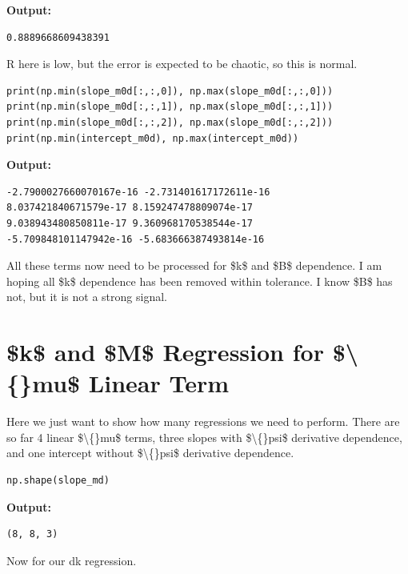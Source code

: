 \documentclass{article}
\begin{document}
\textbf{Output:}\begin{verbatim}
0.8889668609438391

\end{verbatim}

R here is low, but the error is expected to be chaotic, so this is normal.

\begin{lstlisting}
print(np.min(slope_m0d[:,:,0]), np.max(slope_m0d[:,:,0]))
print(np.min(slope_m0d[:,:,1]), np.max(slope_m0d[:,:,1]))
print(np.min(slope_m0d[:,:,2]), np.max(slope_m0d[:,:,2]))
print(np.min(intercept_m0d), np.max(intercept_m0d))\end{lstlisting}

\textbf{Output:}\begin{verbatim}
-2.7900027660070167e-16 -2.731401617172611e-16
8.037421840671579e-17 8.159247478809074e-17
9.038943480850811e-17 9.360968170538544e-17
-5.709848101147942e-16 -5.683666387493814e-16

\end{verbatim}

All these terms now need to be processed for \$k\$ and \$B\$ dependence. I am hoping all \$k\$ dependence has been removed within tolerance. I know \$B\$ has not, but it is not a strong signal.

\section{\$k\$ and \$M\$ Regression for \$\textbackslash\{\}mu\$ Linear Term}

Here we just want to show how many regressions we need to perform. There are so far 4 linear \$\textbackslash\{\}mu\$ terms, three slopes with \$\textbackslash\{\}psi\$ derivative dependence, and one intercept without \$\textbackslash\{\}psi\$ derivative dependence.

\begin{lstlisting}
np.shape(slope_md)\end{lstlisting}

\textbf{Output:}\begin{verbatim}
(8, 8, 3)
\end{verbatim}

Now for our dk regression.
\end{document}
